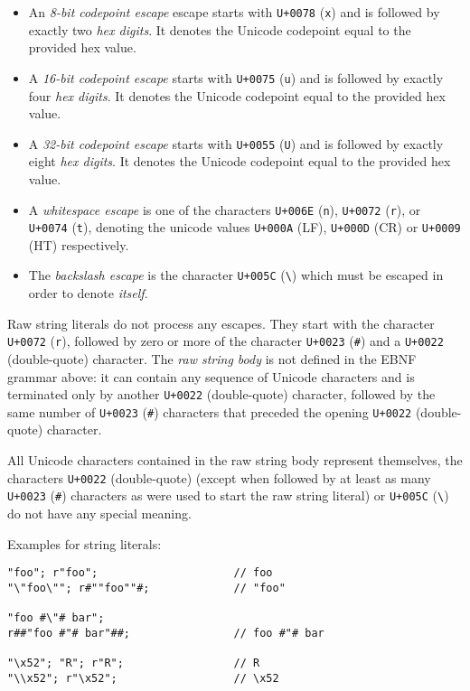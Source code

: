 \documentclass[]{article}
\begin{document}
\begin{itemize}
\itemsep1pt\parskip0pt
\item
  An \emph{8-bit codepoint escape} escape starts with \texttt{U+0078}
  (\texttt{x}) and is followed by exactly two \emph{hex digits}. It
  denotes the Unicode codepoint equal to the provided hex value.
\item
  A \emph{16-bit codepoint escape} starts with \texttt{U+0075}
  (\texttt{u}) and is followed by exactly four \emph{hex digits}. It
  denotes the Unicode codepoint equal to the provided hex value.
\item
  A \emph{32-bit codepoint escape} starts with \texttt{U+0055}
  (\texttt{U}) and is followed by exactly eight \emph{hex digits}. It
  denotes the Unicode codepoint equal to the provided hex value.
\item
  A \emph{whitespace escape} is one of the characters \texttt{U+006E}
  (\texttt{n}), \texttt{U+0072} (\texttt{r}), or \texttt{U+0074}
  (\texttt{t}), denoting the unicode values \texttt{U+000A} (LF),
  \texttt{U+000D} (CR) or \texttt{U+0009} (HT) respectively.
\item
  The \emph{backslash escape} is the character \texttt{U+005C}
  (\texttt{\textbackslash{}}) which must be escaped in order to denote
  \emph{itself}.
\end{itemize}

Raw string literals do not process any escapes. They start with the
character \texttt{U+0072} (\texttt{r}), followed by zero or more of the
character \texttt{U+0023} (\texttt{\#}) and a \texttt{U+0022}
(double-quote) character. The \emph{raw string body} is not defined in
the EBNF grammar above: it can contain any sequence of Unicode
characters and is terminated only by another \texttt{U+0022}
(double-quote) character, followed by the same number of \texttt{U+0023}
(\texttt{\#}) characters that preceded the opening \texttt{U+0022}
(double-quote) character.

All Unicode characters contained in the raw string body represent
themselves, the characters \texttt{U+0022} (double-quote) (except when
followed by at least as many \texttt{U+0023} (\texttt{\#}) characters as
were used to start the raw string literal) or \texttt{U+005C}
(\texttt{\textbackslash{}}) do not have any special meaning.

Examples for string literals:

\begin{verbatim}
"foo"; r"foo";                     // foo
"\"foo\""; r#""foo""#;             // "foo"

"foo #\"# bar";
r##"foo #"# bar"##;                // foo #"# bar

"\x52"; "R"; r"R";                 // R
"\\x52"; r"\x52";                  // \x52
\end{verbatim}
\end{document}
